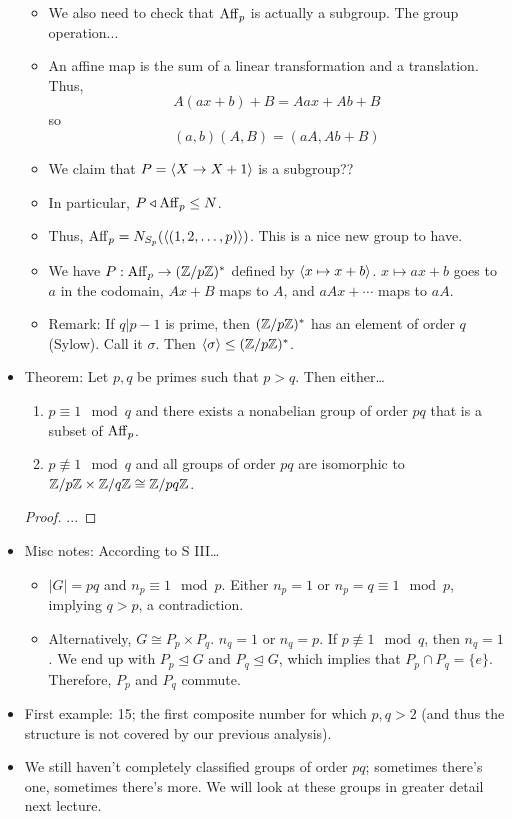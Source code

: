 \documentclass[../notes.tex]{subfiles}
\begin{document}
\begin{itemize}
\begin{itemize}
        \item We also need to check that $\operatorname{Aff}_p$ is actually a subgroup. The group operation...
        \item An affine map is the sum of a linear transformation and a translation. Thus,
        \begin{equation*}
            A(ax+b)+B = Aax+Ab+B
        \end{equation*}
        so
        \begin{equation*}
            (a,b)(A,B) = (aA,Ab+B)
        \end{equation*}
        \item We claim that $P=\left\langle{X\to X+1}\right\rangle$ is a subgroup??
        \item In particular, $P\triangleleft\operatorname{Aff}_p\leq N$.
        \item Thus, $\operatorname{Aff}_p=N_{S_p}(\left\langle{(1,2,\dots,p)}\right\rangle)$. This is a nice new group to have.
        \item We have $P:\operatorname{Aff}_p\to(\mathbb{Z}/p\mathbb{Z})^*$ defined by $\left\langle{x\mapsto x+b}\right\rangle$. $x\mapsto ax+b$ goes to $a$ in the codomain, $Ax+B$ maps to $A$, and $aAx+\cdots$ maps to $aA$.
        \item Remark: If $q|p-1$ is prime, then $(\mathbb{Z}/p\mathbb{Z})^*$ has an element of order $q$ (Sylow). Call it $\sigma$. Then $\left\langle{\sigma}\right\rangle\leq(\mathbb{Z}/p\mathbb{Z})^*$.
    \end{itemize}
    \item Theorem: Let $p,q$ be primes such that $p>q$. Then either\dots
    \begin{enumerate}
        \item $p\equiv 1\mod q$ and there exists a nonabelian group of order $pq$ that is a subset of $\operatorname{Aff}_p$.
        \item $p\not\equiv 1\mod q$ and all groups of order $pq$ are isomorphic to $\mathbb{Z}/p\mathbb{Z}\times\mathbb{Z}/q\mathbb{Z}\cong\mathbb{Z}/pq\mathbb{Z}$.
    \end{enumerate}
    \begin{proof}
        ...
    \end{proof}
    \item Misc notes: According to S III\dots
    \begin{itemize}
        \item $|G|=pq$ and $n_p\equiv 1\mod p$. Either $n_p=1$ or $n_p=q\equiv 1\mod p$, implying $q>p$, a contradiction.
        \item Alternatively, $G\cong P_p\times P_q$. $n_q=1$ or $n_q=p$. If $p\not\equiv 1\mod q$, then $n_q=1$. We end up with $P_p\trianglelefteq G$ and $P_q\trianglelefteq G$, which implies that $P_p\cap P_q=\{e\}$. Therefore, $P_p$ and $P_q$ commute.
    \end{itemize}
    \item First example: 15; the first composite number for which $p,q>2$ (and thus the structure is not covered by our previous analysis).
    \item We still haven't completely classified groups of order $pq$; sometimes there's one, sometimes there's more. We will look at these groups in greater detail next lecture.
\end{itemize}
\end{document}
